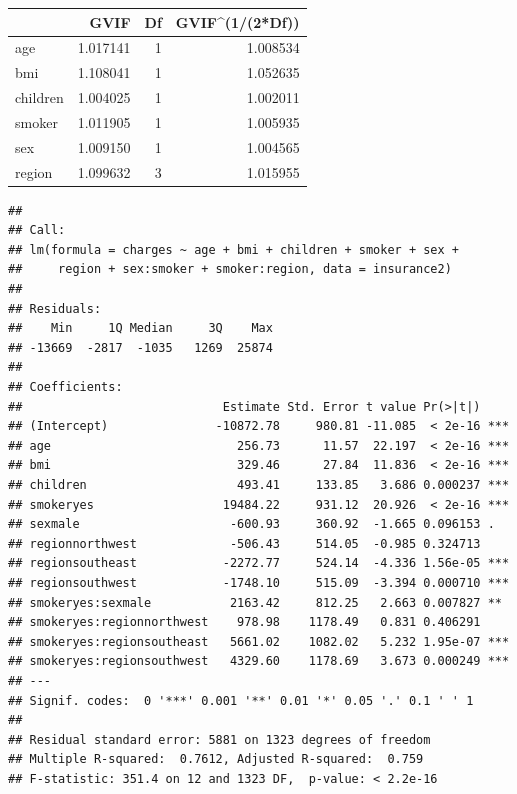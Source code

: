 \documentclass[
  12pt,
]{article}
\begin{document}
\begin{longtable}[]{@{}lrrr@{}}
\toprule\noalign{}
& GVIF & Df & GVIF\^{}(1/(2*Df)) \\
\midrule\noalign{}
\endhead
\bottomrule\noalign{}
\endlastfoot
age & 1.017141 & 1 & 1.008534 \\
bmi & 1.108041 & 1 & 1.052635 \\
children & 1.004025 & 1 & 1.002011 \\
smoker & 1.011905 & 1 & 1.005935 \\
sex & 1.009150 & 1 & 1.004565 \\
region & 1.099632 & 3 & 1.015955 \\
\end{longtable}

\begin{verbatim}
## 
## Call:
## lm(formula = charges ~ age + bmi + children + smoker + sex + 
##     region + sex:smoker + smoker:region, data = insurance2)
## 
## Residuals:
##    Min     1Q Median     3Q    Max 
## -13669  -2817  -1035   1269  25874 
## 
## Coefficients:
##                            Estimate Std. Error t value Pr(>|t|)    
## (Intercept)               -10872.78     980.81 -11.085  < 2e-16 ***
## age                          256.73      11.57  22.197  < 2e-16 ***
## bmi                          329.46      27.84  11.836  < 2e-16 ***
## children                     493.41     133.85   3.686 0.000237 ***
## smokeryes                  19484.22     931.12  20.926  < 2e-16 ***
## sexmale                     -600.93     360.92  -1.665 0.096153 .  
## regionnorthwest             -506.43     514.05  -0.985 0.324713    
## regionsoutheast            -2272.77     524.14  -4.336 1.56e-05 ***
## regionsouthwest            -1748.10     515.09  -3.394 0.000710 ***
## smokeryes:sexmale           2163.42     812.25   2.663 0.007827 ** 
## smokeryes:regionnorthwest    978.98    1178.49   0.831 0.406291    
## smokeryes:regionsoutheast   5661.02    1082.02   5.232 1.95e-07 ***
## smokeryes:regionsouthwest   4329.60    1178.69   3.673 0.000249 ***
## ---
## Signif. codes:  0 '***' 0.001 '**' 0.01 '*' 0.05 '.' 0.1 ' ' 1
## 
## Residual standard error: 5881 on 1323 degrees of freedom
## Multiple R-squared:  0.7612, Adjusted R-squared:  0.759 
## F-statistic: 351.4 on 12 and 1323 DF,  p-value: < 2.2e-16
\end{verbatim}
\end{document}
